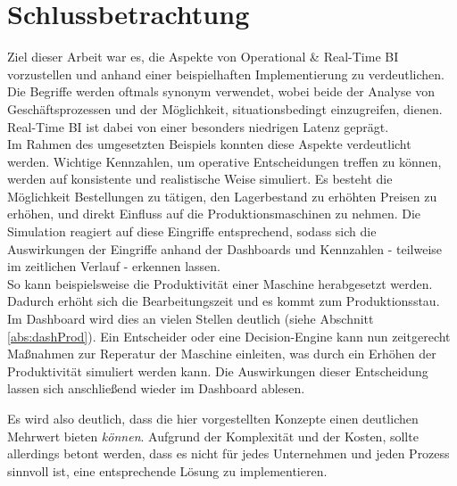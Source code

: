 \chapter{Schlussbetrachtung}
Ziel dieser Arbeit war es, die Aspekte von Operational \& Real-Time \ac{BI} vorzustellen und anhand einer beispielhaften Implementierung zu verdeutlichen.
\\Die Begriffe werden oftmals synonym verwendet, wobei beide der Analyse von Geschäftsprozessen und der Möglichkeit, situationsbedingt einzugreifen, dienen. Real-Time \ac{BI} ist dabei von einer besonders niedrigen Latenz geprägt.
\\Im Rahmen des umgesetzten Beispiels konnten diese Aspekte verdeutlicht werden. Wichtige Kennzahlen, um operative Entscheidungen treffen zu können, werden auf konsistente und realistische Weise simuliert. Es besteht die Möglichkeit Bestellungen zu tätigen, den Lagerbestand zu erhöhten Preisen zu erhöhen, und direkt Einfluss auf die Produktionsmaschinen zu nehmen. Die Simulation reagiert auf diese Eingriffe entsprechend, sodass sich die Auswirkungen der Eingriffe anhand der Dashboards und Kennzahlen - teilweise im zeitlichen Verlauf - erkennen lassen. 
\\So kann beispielsweise die Produktivität einer Maschine herabgesetzt werden. Dadurch erhöht sich die Bearbeitungszeit und es kommt zum Produktionsstau. Im Dashboard wird dies an vielen Stellen deutlich (siehe Abschnitt \ref{abs:dashProd}). Ein Entscheider oder eine Decision-Engine kann nun zeitgerecht Maßnahmen zur Reperatur der Maschine einleiten, was durch ein Erhöhen der Produktivität simuliert werden kann. Die Auswirkungen dieser Entscheidung lassen sich anschließend wieder im Dashboard ablesen.

Es wird also deutlich, dass die hier vorgestellten Konzepte einen deutlichen Mehrwert bieten \textit{können}. Aufgrund der Komplexität und der Kosten, sollte allerdings betont werden, dass es nicht für jedes Unternehmen und jeden Prozess sinnvoll ist, eine entsprechende Lösung zu implementieren.
